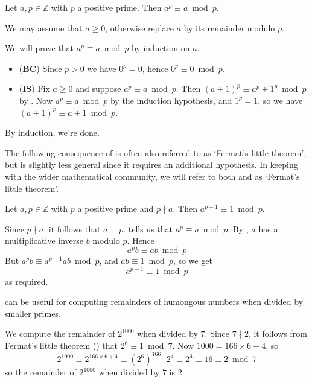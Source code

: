 \begin{theorem} \label{thmFermatLittle} 
Let $a,p \in \mathbb{Z}$ with $p$ a positive prime. Then $a^p \equiv a \bmod p$.
\end{theorem}
\begin{cproof}
We may assume that $a \ge 0$, otherwise replace $a$ by its remainder modulo $p$.

We will prove that $a^{p} \equiv a \bmod p$ by induction on $a$.
\begin{itemize}
\item (\textbf{BC}) Since $p > 0$ we have $0^p=0$, hence $0^p \equiv 0 \bmod p$.
\item (\textbf{IS}) Fix $a \ge 0$ and suppose $a^p \equiv a \bmod p$. Then $(a+1)^p \equiv a^p+1^p \bmod p$ by . Now $a^p \equiv a \bmod p$ by the induction hypothesis, and $1^p = 1$, so we have $(a+1)^p \equiv a+1 \bmod p$.
\end{itemize}
By induction, we're done.
\end{cproof}

The following consequence of  is often also referred to as `Fermat's little theorem', but is slightly less general since it requires an additional hypothesis. In keeping with the wider mathematical community, we will refer to both  and  as `Fermat's little theorem'.

\begin{corollary}
\label{corFermatLittleAlt}
Let $a,p \in \mathbb{Z}$ with $p$ a positive prime and $p \nmid a$. Then $a^{p-1} \equiv 1 \bmod p$.
\end{corollary}
\begin{cproof}
Since $p \nmid a$, it follows that $a \perp p$.  tells us that $a^p \equiv a \bmod p$. By , $a$ has a multiplicative inverse $b$ modulo $p$. Hence
\[ a^{p}b \equiv ab \bmod p \]
But $a^{p}b \equiv a^{p-1}ab \bmod p$, and $ab \equiv 1 \bmod p$, so we get
\[ a^{p-1} \equiv 1 \bmod p \]
as required.
\end{cproof}

 can be useful for computing remainders of humongous numbers when divided by smaller primes.

\begin{example}
We compute the remainder of $2^{1000}$ when divided by $7$. Since $7 \nmid 2$, it follows from Fermat's little theorem () that $2^6 \equiv 1 \bmod 7$. Now $1000 = 166 \times 6 + 4$, so
\[ 2^{1000} \equiv 2^{166 \times 6 + 4} \equiv (2^6)^{166} \cdot 2^4 \equiv 2^4 \equiv 16 \equiv 2 \bmod 7 \]
so the remainder of $2^{1000}$ when divided by $7$ is $2$.
\end{example}

